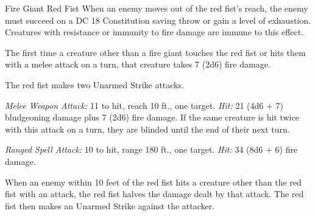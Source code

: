 \documentclass[10pt,a4paper,twoside,bg=print,twocolumn,openany,nodeprecatedcode]{dndbook}
\begin{document}
\begin{DndMonster}[float=t]{Fire Giant Red Fist}
\DndMonsterBasics[
armor-class = {17 (natural armor)},
hit-points = {\DndDice{13d12 + 78}},
speed = {40 ft.}
]
\DndMonsterAbilityScores[
 str = 25,
 dex = 14,
 con = 23,
 int = 10,
 wis = 14,
 cha = 13
]
\DndMonsterDetails[
saving-throws = {Str +11, Dex +6, Con +10},
skills = {Athletics +11, Perception +6},
damage-immunities = {fire},
languages = {Giant},
challenge = 9,
]
When an enemy moves out of the red fist's reach, the enemy must succeed on a DC 18 Constitution saving throw or gain a level of exhaustion. Creatures with resistance or immunity to fire damage are immune to this effect.

The first time a creature other than a fire giant touches the red fist or hits them with a melee attack on a turn, that creature takes 7 (2d6) fire damage.

The red fist makes two Unarmed Strike attacks.

\textsl{Melee Weapon Attack:} 11 to hit, reach 10 ft., one target. \textsl{Hit:} 21 (4d6 + 7) bludgeoning damage plus 7 (2d6) fire damage. If the same creature is hit twice with this attack on a turn, they are blinded until the end of their next turn.

\textsl{Ranged Spell Attack:} 10 to hit, range 180 ft., one target. \textsl{Hit:} 34 (8d6 + 6) fire damage.

When an enemy within 10 feet of the red fist hits a creature other than the red fist with an attack, the red fist halves the damage dealt by that attack. The red fist then makes an Unarmed Strike against the attacker.

\end{DndMonster}
\end{document}
